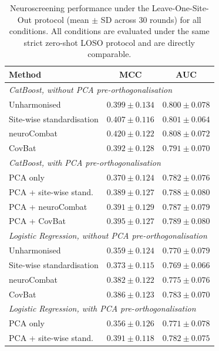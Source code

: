 \documentclass[preprint,12pt]{elsarticle}
\begin{document}
\begin{table}[htbp]
  \centering
  \caption{Neuroscreening performance under the Leave-One-Site-Out
    protocol (mean $\pm$ SD across 30 rounds) for all conditions.
    All conditions are evaluated under the same strict zero-shot LOSO
    protocol and are directly comparable.}
  \label{tab:clinical_loso}
  \begin{tabular}{lcc}
    \toprule
    \textbf{Method} & \textbf{MCC} & \textbf{AUC} \\
    \midrule
    \multicolumn{3}{l}{\textit{CatBoost, without PCA
      pre-orthogonalisation}} \\
    \quad Unharmonised
      & $0.399 \pm 0.134$ & $0.800 \pm 0.078$ \\
    \quad Site-wise standardisation
      & $0.407 \pm 0.116$ & $0.801 \pm 0.064$ \\
    \quad neuroCombat
      & $0.420 \pm 0.122$ & $0.808 \pm 0.072$ \\
    \quad CovBat
      & $0.392 \pm 0.128$ & $0.791 \pm 0.070$ \\
    \midrule
    \multicolumn{3}{l}{\textit{CatBoost, with PCA
      pre-orthogonalisation}} \\
    \quad PCA only
      & $0.370 \pm 0.124$ & $0.782 \pm 0.076$ \\
    \quad PCA + site-wise stand.
      & $0.389 \pm 0.127$ & $0.788 \pm 0.080$ \\
    \quad PCA + neuroCombat
      & $0.391 \pm 0.129$ & $0.787 \pm 0.079$ \\
    \quad PCA + CovBat
      & $0.395 \pm 0.127$ & $0.789 \pm 0.080$ \\
    \midrule
    \multicolumn{3}{l}{\textit{Logistic Regression, without PCA pre-orthogonalisation}} \\
    \quad Unharmonised
      & $0.359 \pm 0.124$ & $0.770 \pm 0.079$ \\
    \quad Site-wise standardisation
      & $0.373 \pm 0.115$ & $0.769 \pm 0.066$ \\
    \quad neuroCombat
      & $0.382 \pm 0.122$ & $0.775 \pm 0.076$ \\
    \quad CovBat
      & $0.386 \pm 0.123$ & $0.783 \pm 0.070$ \\
    \midrule
    \multicolumn{3}{l}{\textit{Logistic Regression, with PCA pre-orthogonalisation}} \\
    \quad PCA only
      & $0.356 \pm 0.126$ & $0.771 \pm 0.078$ \\
    \quad PCA + site-wise stand.
      & $0.391 \pm 0.118$ & $0.782 \pm 0.075$ \\

\end{tabular}
\end{table}
\end{document}
